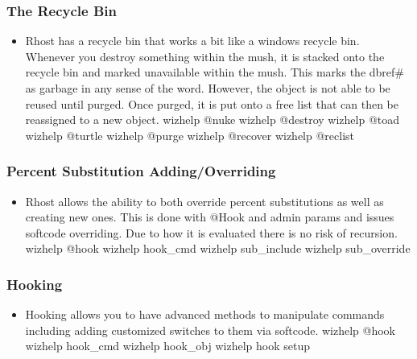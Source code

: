 \documentclass[letterpaper,10pt,english]{sphinxmanual}
\begin{document}
\subsubsection{The Recycle Bin}
\label{\detokenize{features:the-recycle-bin}}\begin{itemize}
\item {} 
\sphinxAtStartPar
Rhost has a recycle bin that works a bit like a windows recycle bin.
Whenever you destroy something within the mush, it is stacked onto
the recycle bin and marked unavailable within the mush.  This marks
the dbref\# as garbage in any sense of the word.  However, the object
is not able to be reused until purged.  Once purged, it is put onto
a free list that can then be reassigned to a new object.
\sphinxhyphen{} wizhelp @nuke
\sphinxhyphen{} wizhelp @destroy
\sphinxhyphen{} wizhelp @toad
\sphinxhyphen{} wizhelp @turtle
\sphinxhyphen{} wizhelp @purge
\sphinxhyphen{} wizhelp @recover
\sphinxhyphen{} wizhelp @reclist

\end{itemize}


\subsubsection{Percent Substitution Adding/Overriding}
\label{\detokenize{features:percent-substitution-adding-overriding}}\begin{itemize}
\item {} 
\sphinxAtStartPar
Rhost allows the ability to both override percent substitutions as
well as creating new ones.  This is done with @Hook and admin
params and issues softcode overriding.  Due to how it is evaluated
there is no risk of recursion.
\sphinxhyphen{} wizhelp @hook
\sphinxhyphen{} wizhelp hook\_cmd
\sphinxhyphen{} wizhelp sub\_include
\sphinxhyphen{} wizhelp sub\_override

\end{itemize}


\subsubsection{Hooking}
\label{\detokenize{features:hooking}}\begin{itemize}
\item {} 
\sphinxAtStartPar
Hooking allows you to have advanced methods to manipulate commands
including adding customized switches to them via softcode.
\sphinxhyphen{} wizhelp @hook
\sphinxhyphen{} wizhelp hook\_cmd
\sphinxhyphen{} wizhelp hook\_obj
\sphinxhyphen{} wizhelp hook setup

\end{itemize}
\end{document}
